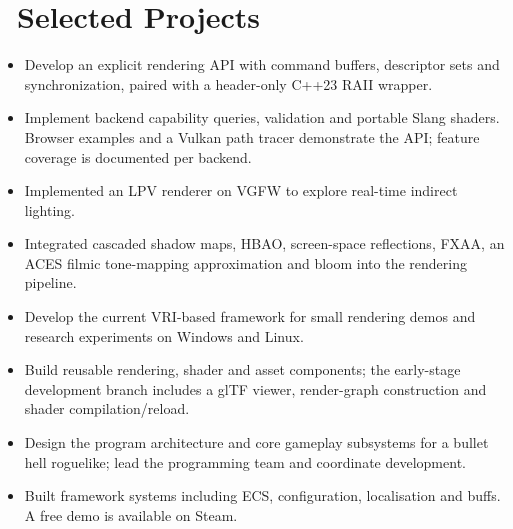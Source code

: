 \documentclass{resume}
\begin{document}
\section{\faCogs\ Selected Projects}
\begin{itemize}
  \item Develop an explicit rendering API with command buffers, descriptor sets and synchronization, paired with a header-only C++23 RAII wrapper.
  \item Implement backend capability queries, validation and portable Slang shaders. Browser examples and a Vulkan path tracer demonstrate the API; feature coverage is documented per backend.
\end{itemize}

\begin{itemize}
  \item Implemented an LPV renderer on VGFW to explore real-time indirect lighting.
  \item Integrated cascaded shadow maps, HBAO, screen-space reflections, FXAA, an ACES filmic tone-mapping approximation and bloom into the rendering pipeline.
\end{itemize}

\begin{itemize}
  \item Develop the current VRI-based framework for small rendering demos and research experiments on Windows and Linux.
  \item Build reusable rendering, shader and asset components; the early-stage development branch includes a glTF viewer, render-graph construction and shader compilation/reload.
\end{itemize}

\begin{itemize}
  \item Design the program architecture and core gameplay subsystems for a bullet hell roguelike; lead the programming team and coordinate development.
  \item Built framework systems including ECS, configuration, localisation and buffs. A free demo is available on Steam.
\end{itemize}
\end{document}
